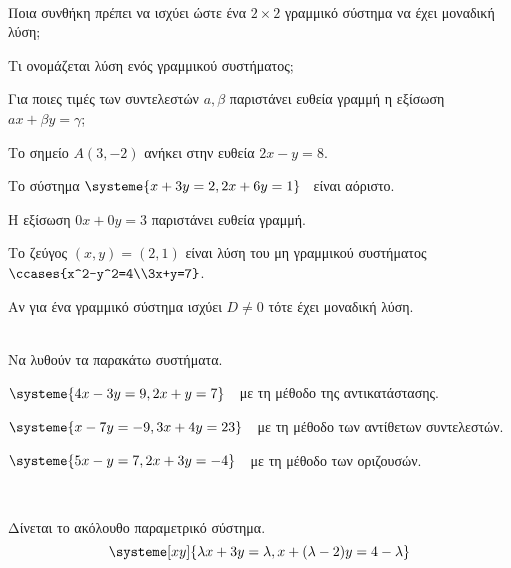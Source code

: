 \documentclass[ektypwsh]{frontisthrio-diag}
\begin{document}
\vspace{-15mm}
\begin{thema}
\item\mbox{}\\\vspace{-7mm}
\begin{erwthma}
\item Ποια συνθήκη πρέπει να ισχύει ώστε ένα $ 2\times2 $ γραμμικό σύστημα να έχει μοναδική λύση;
\item Τι ονομάζεται λύση ενός γραμμικού συστήματος;
\item Για ποιες τιμές των συντελεστών $ a,\beta $ παριστάνει ευθεία γραμμή η εξίσωση $ ax+\beta y=\gamma $;
\item \swstolathos
\begin{alist}[leftmargin=3mm]
\item Το σημείο $ A(3,-2) $ ανήκει στην ευθεία $ 2x-y=8 $.
\item Το σύστημα $ \systeme{x+3y=2,2x+6y=1} $ \ είναι αόριστο.
\item Η εξίσωση $ 0x+0y=3 $ παριστάνει ευθεία γραμμή.
\item Το ζεύγος $ (x,y)=(2,1) $ είναι λύση του μη γραμμικού συστήματος $ \ccases{x^2-y^2=4\\3x+y=7} $.
\item Αν για ένα γραμμικό σύστημα ισχύει $ D\neq0 $ τότε έχει μοναδική λύση.
\end{alist}
\end{erwthma}
\item\mbox{}\\
Να λυθούν τα παρακάτω συστήματα.
\begin{erwthma}
\item $ \systeme{4x-3y=9,2x+y=7}\ \  $ με τη μέθοδο της αντικατάστασης.
\item $ \systeme{x-7y=-9,3x+4y=23}\ \  $ με τη μέθοδο των αντίθετων συντελεστών.
\item $ \systeme{5x-y=7,2x+3y=-4}\ \  $ με τη μέθοδο των οριζουσών.
\end{erwthma}
\item\mbox{}\\\vspace{-7mm}
\begin{erwthma}
\item Δίνεται το ακόλουθο παραμετρικό σύστημα.
\[ \systeme[xy]{\lambda x+3y=\lambda,x+{(\lambda-2)}y=4-\lambda} \]
\begin{alist}

\end{alist}
\end{erwthma}
\end{thema}
\end{document}
